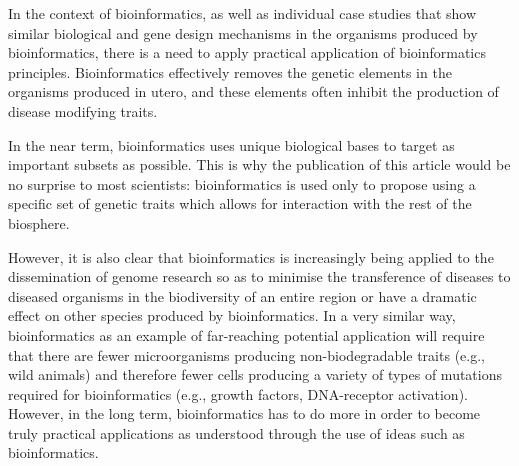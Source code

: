\documentclass{article}
\begin{document}
In the context of bioinformatics, as well as individual case studies that show similar biological and gene design mechanisms in the organisms produced by bioinformatics, there is a need to apply practical application of bioinformatics principles. Bioinformatics effectively removes the genetic elements in the organisms produced in utero, and these elements often inhibit the production of disease modifying traits.

In the near term, bioinformatics uses unique biological bases to target as important subsets as possible. This is why the publication of this article would be no surprise to most scientists: bioinformatics is used only to propose using a specific set of genetic traits which allows for interaction with the rest of the biosphere.

However, it is also clear that bioinformatics is increasingly being applied to the dissemination of genome research so as to minimise the transference of diseases to diseased organisms in the biodiversity of an entire region or have a dramatic effect on other species produced by bioinformatics. In a very similar way, bioinformatics as an example of far-reaching potential application will require that there are fewer microorganisms producing non-biodegradable traits (e.g., wild animals) and therefore fewer cells producing a variety of types of mutations required for bioinformatics (e.g., growth factors, DNA-receptor activation). However, in the long term, bioinformatics has to do more in order to become truly practical applications as understood through the use of ideas such as bioinformatics.
\end{document}
